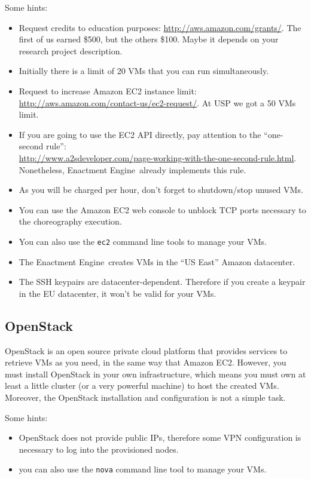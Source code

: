 \documentclass[a4paper, 10pt]{article}
\newcommand{\ee}{Enactment Engine}
\begin{document}
Some hints:

\begin{itemize}
\item Request credits to education purposes: \url{http://aws.amazon.com/grants/}. The first of us earned \$500, but the others \$100. Maybe it depends on your research project description.
\item Initially there is a limit of 20 VMs that you can run simultaneously.
\item Request to increase Amazon EC2 instance limit: \url{http://aws.amazon.com/contact-us/ec2-request/}. At USP we got a 50 VMs limit.
\item If you are going to use the EC2 API directly, pay attention to the ``one-second rule'': \\ \url{http://www.a2sdeveloper.com/page-working-with-the-one-second-rule.html}. Nonetheless, \ee\ already implements this rule.
\item As you will be charged per hour, don't forget to shutdown/stop unused VMs.
\item You can use the Amazon EC2 web console to unblock TCP ports necessary to the choreography execution.
\item You can also use the \texttt{ec2} command line tools to manage your VMs.
\item The \ee\ creates VMs in the ``US East'' Amazon datacenter.
\item The SSH keypairs are datacenter-dependent. Therefore if you create a keypair in the EU
datacenter, it won't be valid for your VMs.
\end{itemize}

\subsection{OpenStack}

OpenStack is an open source private cloud platform that provides services to retrieve VMs as you need, in the same way that Amazon EC2. However, you must install OpenStack in your own infrastructure, which means you must own at least a little cluster (or a very powerful machine) to host the created VMs. Moreover, the OpenStack installation and configuration is not a simple task.

Some hints:

\begin{itemize}
\item OpenStack does not provide public IPs, therefore some VPN configuration is necessary to log into the provisioned nodes.
\item you can also use the \texttt{nova} command line tool to manage your VMs.
\end{itemize}
\end{document}

